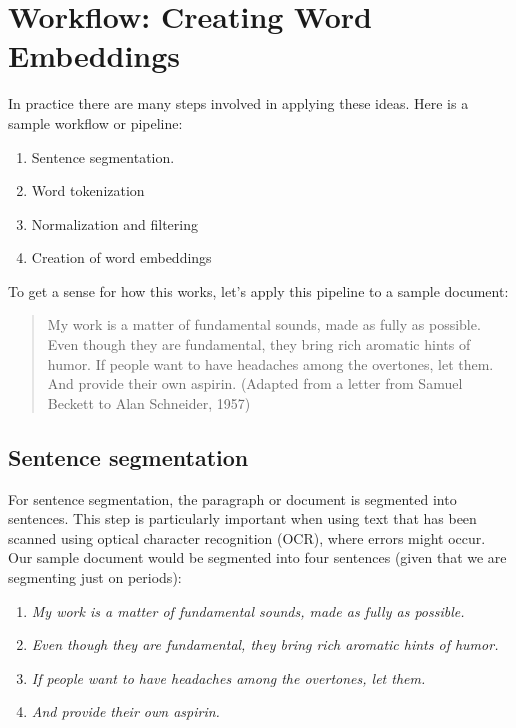
\section{Workflow: Creating Word Embeddings}\label{createWordEmbeddings}

In practice there are many steps involved in applying these ideas. Here is a sample workflow or pipeline:
\begin{enumerate}
\item Sentence segmentation.
\item Word tokenization
\item Normalization and filtering
\item Creation of word embeddings
\end{enumerate}

To get a sense for how this works, let's apply this pipeline to a sample document:

\begin{quote}
My work is a matter of fundamental sounds, made as fully as possible. Even though they are fundamental, they bring rich aromatic hints of humor. If people want to have headaches among the overtones, let them. And provide their own aspirin. (Adapted from a letter from Samuel Beckett to Alan Schneider, 1957)
\end{quote}

\subsection{Sentence segmentation} 

For sentence segmentation, the paragraph or document is segmented into sentences. This step is particularly important when using text that has been scanned using optical character recognition (OCR), where errors might occur. Our sample document would be segmented into four sentences (given that we are segmenting just on periods):

\begin{enumerate}
    \item \textit{My work is a matter of fundamental sounds, made as fully as possible.}
    \item \textit{Even though they are fundamental, they bring rich aromatic hints of humor.}
    \item \textit{If people want to have headaches among the overtones, let them.}
    \item \textit{And provide their own aspirin.}
\end{enumerate}

